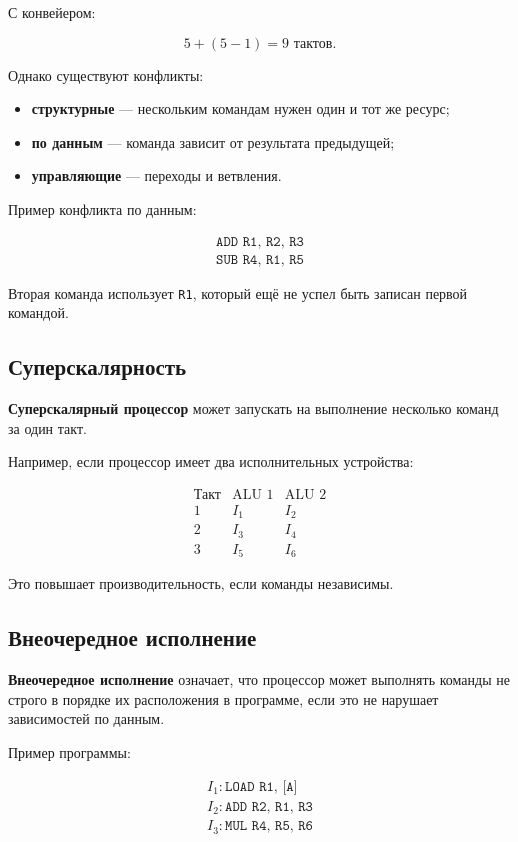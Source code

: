 \documentclass[12pt,a4paper]{article}
\theoremstyle{remark}
\begin{document}
С конвейером:

\[
5 + (5 - 1) = 9 \text{ тактов}.
\]

Однако существуют конфликты:
\begin{itemize}
    \item \textbf{структурные} --- нескольким командам нужен один и тот же ресурс;
    \item \textbf{по данным} --- команда зависит от результата предыдущей;
    \item \textbf{управляющие} --- переходы и ветвления.
\end{itemize}

Пример конфликта по данным:

\[
\begin{array}{l}
\texttt{ADD R1, R2, R3} \\
\texttt{SUB R4, R1, R5}
\end{array}
\]

Вторая команда использует \texttt{R1}, который ещё не успел быть записан первой командой.

\subsection{Суперскалярность}

\textbf{Суперскалярный процессор} может запускать на выполнение несколько команд за один такт.

Например, если процессор имеет два исполнительных устройства:

\[
\begin{array}{c|cc}
\text{Такт} & \text{ALU 1} & \text{ALU 2} \\ \hline
1 & I_1 & I_2 \\
2 & I_3 & I_4 \\
3 & I_5 & I_6
\end{array}
\]

Это повышает производительность, если команды независимы.

\subsection{Внеочередное исполнение}

\textbf{Внеочередное исполнение} означает, что процессор может выполнять команды не строго в порядке их расположения в программе, если это не нарушает зависимостей по данным.

Пример программы:

\[
\begin{array}{l}
I_1: \texttt{LOAD R1, [A]} \\
I_2: \texttt{ADD R2, R1, R3} \\
I_3: \texttt{MUL R4, R5, R6}
\end{array}
\]
\end{document}
